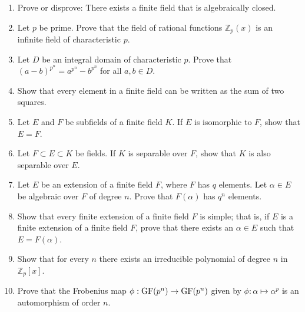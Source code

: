 {\begin{enumerate}
\begin{enumerate}
\bf\item\rm
length 15.

\end{enumerate}






\bf\item\rm
Prove or disprove: There exists a finite field that is algebraically
closed. 


\bf\item\rm
Let $p$ be prime.  Prove that the field of rational functions ${\mathbb
Z}_p(x)$ is an infinite field of characteristic $p$.


\bf\item\rm
Let $D$ be an integral domain of characteristic $p$.  Prove that $(a -
b)^{p^n} = a^{p^n} - b^{p^n}$ for all $a, b \in D$.


\bf\item\rm
Show that every element in a finite field can be written as the sum
of two squares.




\bf\item\rm
Let $E$ and $F$ be subfields of a finite field $K$. If $E$ is
isomorphic to $F$, show that $E=F$.


\bf\item\rm
Let $F \subset E \subset K$ be fields. If $K$ is separable over $F$,
show that $K$ is also separable over $E$.


\bf\item\rm
Let $E$ be an extension of a finite field $F$, where $F$ has $q$
elements. Let $\alpha \in E$ be algebraic over $F$ of degree $n$.
Prove that $F( \alpha )$ has $q^n$ elements. 


\bf\item\rm
Show that every finite extension of a finite field $F$ is simple;
that is, if $E$ is a finite extension of a finite field $F$, prove
that there exists an $\alpha \in E$ such that $E = F( \alpha )$.


\bf\item\rm
Show that for every $n$ there exists an irreducible polynomial of 
degree $n$ in~${\mathbb Z}_p[x]$.



\bf\item\rm
Prove that the {\bfi Frobenius map} $\phi : {\rm
GF}(p^n) \rightarrow {\rm GF}(p^n)$ given by $\phi : \alpha \mapsto
\alpha^p$ is an automorphism of order $n$. 



\end{enumerate}}
